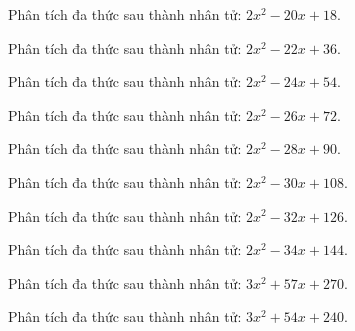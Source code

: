 \begin{bt}
	Phân tích đa thức sau thành nhân tử: $2 x^2 - 20 x + 18$.
\end{bt}
\begin{bt}
	Phân tích đa thức sau thành nhân tử: $2 x^2 - 22 x + 36$.
\end{bt}
\begin{bt}
	Phân tích đa thức sau thành nhân tử: $2 x^2 - 24 x + 54$.
\end{bt}
\begin{bt}
	Phân tích đa thức sau thành nhân tử: $2 x^2 - 26 x + 72$.
\end{bt}
\begin{bt}
	Phân tích đa thức sau thành nhân tử: $2 x^2 - 28 x + 90$.
\end{bt}
\begin{bt}
	Phân tích đa thức sau thành nhân tử: $2 x^2 - 30 x + 108$.
\end{bt}
\begin{bt}
	Phân tích đa thức sau thành nhân tử: $2 x^2 - 32 x + 126$.
\end{bt}
\begin{bt}
	Phân tích đa thức sau thành nhân tử: $2 x^2 - 34 x + 144$.
\end{bt}
\begin{bt}
	Phân tích đa thức sau thành nhân tử: $3 x^2 + 57 x + 270$.
\end{bt}
\begin{bt}
	Phân tích đa thức sau thành nhân tử: $3 x^2 + 54 x + 240$.
\end{bt}
